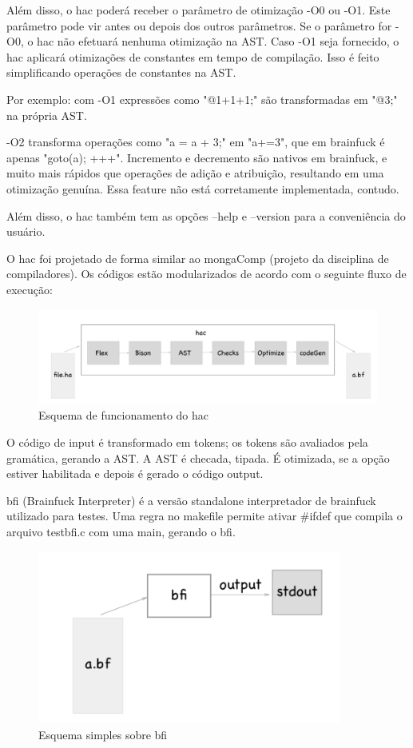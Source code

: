Além disso, o hac poderá receber o parâmetro de otimização -O0 ou -O1. Este parâmetro pode vir antes ou depois dos outros parâmetros. Se o parâmetro for -O0, o hac não efetuará nenhuma otimização na AST. Caso -O1 seja fornecido, o hac aplicará otimizações de constantes em tempo de compilação. Isso é feito simplificando operações de constantes na AST. 

Por exemplo: com -O1 expressões como "@1+1+1;" são transformadas em "@3;" na própria AST. 

-O2 transforma operações como "a = a + 3;" em "a+=3", que em brainfuck é apenas "goto(a); +++". Incremento e decremento são nativos em brainfuck, e muito mais rápidos que operações de adição e atribuição, resultando em uma otimização genuína. Essa feature não está corretamente implementada, contudo.

Além disso, o hac também tem as opções --help e --version para a conveniência do usuário.

O hac foi projetado de forma similar ao mongaComp (projeto da disciplina de compiladores). Os códigos estão modularizados de acordo com o seguinte fluxo de execução:

\begin{figure}[h]
    \centering
	\includegraphics[width = 15cm]{TD/img/esquematicoHac.png}
	\caption{Esquema de funcionamento do hac}
	\label{esquematicoHac}
\end{figure}

O código de input é transformado em tokens; os tokens são avaliados pela gramática, gerando a AST. A AST é checada, tipada. É otimizada, se a opção estiver habilitada e depois é gerado o código output.

bfi (Brainfuck Interpreter) é a versão standalone interpretador de brainfuck utilizado para testes. Uma regra no makefile permite ativar \#ifdef que compila o arquivo testbfi.c com uma main, gerando o bfi. 

\begin{figure}[h]
    \centering
	\includegraphics[width = 10cm]{TD/img/bfi.png}
	\caption{Esquema simples sobre bfi}
	\label{bfi}
\end{figure}


